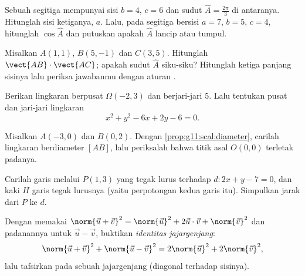 \begin{exercise}[$\star\star$]\label{exo:g11:scal:5}
Sebuah segitiga mempunyai sisi $b = 4$, $c = 6$ dan sudut
$\widehat A = \frac{2\pi}{3}$ di antaranya. Hitunglah sisi ketiganya, $a$.
Lalu, pada segitiga bersisi $a = 7$, $b = 5$, $c = 4$, hitunglah
$\cos\widehat A$ dan putuskan apakah $\widehat A$ lancip atau tumpul.
\end{exercise}

\begin{exercise}[$\star\star$]\label{exo:g11:scal:6}
Misalkan $A(1, 1)$, $B(5, -1)$ dan $C(3, 5)$. Hitunglah
$\vect{AB} \cdot \vect{AC}$; apakah sudut $\widehat A$ siku-siku? Hitunglah
ketiga panjang sisinya lalu periksa jawabanmu dengan aturan .
\end{exercise}

\begin{exercise}[$\star\star$]\label{exo:g11:scal:7}
Berikan  lingkaran berpusat $\Omega(-2, 3)$ dan berjari-jari $5$.
Lalu tentukan pusat dan jari-jari lingkaran
\[
x^2 + y^2 - 6x + 2y - 6 = 0 .
\]
\end{exercise}

\begin{exercise}[$\star\star$]\label{exo:g11:scal:8}
Misalkan $A(-3, 0)$ dan $B(0, 2)$. Dengan \cref{prop:g11:scal:diameter},
carilah  lingkaran berdiameter $[AB]$, lalu periksalah bahwa titik
asal $O(0,0)$ terletak padanya.
\end{exercise}

\begin{exercise}[$\star\star$]\label{exo:g11:scal:9}
Carilah  garis melalui $P(1, 3)$ yang tegak lurus terhadap
$d : 2x + y - 7 = 0$, dan  kaki $H$ garis tegak
lurusnya (yaitu perpotongan kedua garis itu). Simpulkan jarak
dari $P$ ke $d$.
\end{exercise}

\begin{exercise}[$\star\star$]\label{exo:g11:scal:10}
Dengan memakai $\norm{\vec u + \vec v}^2 = \norm{\vec u}^2 + 2\vec u\cdot\vec v +
\norm{\vec v}^2$ dan padanannya untuk $\vec u - \vec v$, buktikan
\emph{identitas jajargenjang}:
\[
\norm{\vec u + \vec v}^2 + \norm{\vec u - \vec v}^2
= 2\norm{\vec u}^2 + 2\norm{\vec v}^2 ,
\]
lalu tafsirkan pada sebuah jajargenjang (diagonal terhadap sisinya).
\end{exercise}

